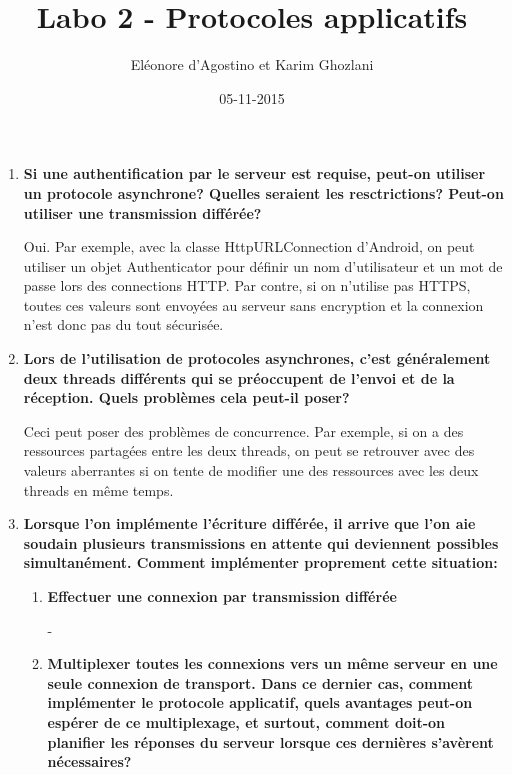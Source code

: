 \documentclass{article}
\title{Labo 2 - Protocoles applicatifs}
\date{05-11-2015}
\author{Eléonore d'Agostino et Karim Ghozlani}
\begin{document}
  \maketitle
  \newpage

  \begin{enumerate}
    \item \textbf{Si une authentification par le serveur est requise, peut-on utiliser un protocole asynchrone? Quelles seraient les resctrictions? Peut-on utiliser une transmission différée?}

      Oui. Par exemple, avec la classe HttpURLConnection d'Android, on peut utiliser un objet Authenticator pour définir un nom d'utilisateur et un mot de passe lors des connections HTTP. Par contre, si on n'utilise pas HTTPS, toutes ces valeurs sont envoyées au serveur sans encryption et la connexion n'est donc pas du tout sécurisée.
      
      

    \item \textbf{Lors de l'utilisation de protocoles asynchrones, c'est généralement deux threads différents qui se préoccupent de l'envoi et de la réception. Quels problèmes cela peut-il poser?}
      
      Ceci peut poser des problèmes de concurrence. Par exemple, si on a des ressources partagées entre les deux threads, on peut se retrouver avec des valeurs aberrantes si on tente de modifier une des ressources avec les deux threads en même temps.

    \item \textbf{Lorsque l'on implémente l'écriture différée, il arrive que l'on aie soudain plusieurs transmissions en attente qui deviennent possibles simultanément. Comment implémenter proprement cette situation:}
      
      \begin{enumerate}
        \item \textbf{Effectuer une connexion par transmission différée}
        
        -
    
        \item \textbf{Multiplexer toutes les connexions vers un même serveur en une seule connexion de transport. Dans ce dernier cas, comment implémenter le protocole applicatif, quels avantages peut-on espérer de ce multiplexage, et surtout, comment doit-on planifier les réponses du serveur lorsque ces dernières s'avèrent nécessaires?}
    

\end{enumerate}
\end{enumerate}
\end{document}
